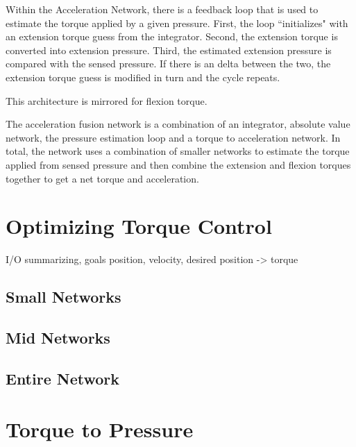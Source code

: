 
Within the Acceleration Network, there is a feedback loop that is used to 
estimate the torque applied by a given pressure. First, the loop ``initializes"
with an extension torque guess from the integrator. Second, the extension
torque is converted into extension pressure. Third, the estimated extension
pressure is compared with the sensed pressure. If there is an delta between the
two, the extension torque guess is modified in turn and the cycle repeats.


This architecture is mirrored for flexion torque.




The acceleration fusion network is a combination of an integrator, absolute
value network, the pressure estimation loop and a torque to acceleration
network. In total, the network uses a combination of smaller networks to
estimate the torque applied from sensed pressure and then combine the extension
and flexion torques together to get a net torque and acceleration.

\section{Optimizing Torque Control}

I/O summarizing, goals
position, velocity, desired position -> torque

\subsection{Small Networks}


\subsection{Mid Networks}


\subsection{Entire Network}


\section{Torque to Pressure}

